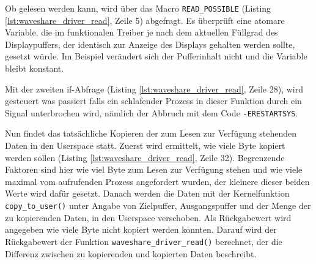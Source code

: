 Ob gelesen werden kann, wird über das Macro \texttt{READ\_POSSIBLE} (Listing \ref{lst:waveshare_driver_read}, Zeile 5) abgefragt. Es überprüft eine atomare Variable, die im funktionalen Treiber je nach dem aktuellen Füllgrad des Displaypuffers, der identisch zur Anzeige des Displays gehalten werden sollte, gesetzt würde. Im Beispiel verändert sich der Pufferinhalt nicht und die Variable bleibt konstant. 

Mit der zweiten if-Abfrage (Listing \ref{lst:waveshare_driver_read}, Zeile 28), wird gesteuert was passiert falls ein schlafender Prozess in dieser Funktion durch ein Signal unterbrochen wird, nämlich der Abbruch mit dem Code \texttt{-ERESTARTSYS}.

Nun findet das tatsächliche Kopieren der zum Lesen zur Verfügung stehenden Daten in den Userspace statt. Zuerst wird ermittelt, wie viele Byte kopiert werden sollen (Listing \ref{lst:waveshare_driver_read}, Zeile 32). Begrenzende Faktoren sind hier wie viel Byte zum Lesen zur Verfügung stehen und wie viele maximal vom aufrufenden Prozess angefordert wurden, der kleinere dieser beiden Werte wird dafür gesetzt. Danach werden die Daten mit der Kernelfunktion \texttt{copy\_to\_user()} unter Angabe von Zielpuffer, Ausgangspuffer und der Menge der zu kopierenden Daten, in den Userspace verschoben. Als Rückgabewert wird angegeben wie viele Byte nicht kopiert werden konnten. Darauf wird der Rückgabewert der Funktion \texttt{waveshare_driver_read()} berechnet, der die Differenz zwischen zu kopierenden und kopierten Daten beschreibt.


